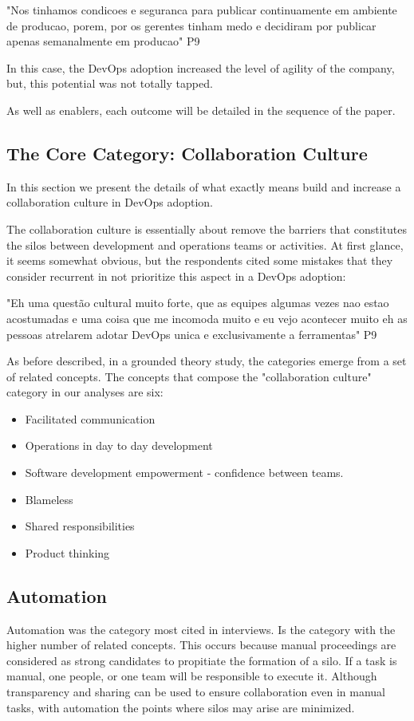 "Nos tinhamos condicoes e seguranca para publicar continuamente em ambiente de producao, porem, por os gerentes tinham medo e decidiram por publicar apenas semanalmente em producao" P9

In this case, the DevOps adoption increased the level of agility of the company, but, this potential was not totally tapped.

As well as enablers, each outcome will be detailed in the sequence of the paper.

\subsection{The Core Category: Collaboration Culture}
In this section we present the details of what exactly means build and increase a collaboration culture in DevOps adoption.

The collaboration culture is essentially about remove the barriers that constitutes the silos between development and operations teams or activities. At first glance, it seems somewhat obvious, but the respondents cited some mistakes that they consider recurrent in not prioritize this aspect in a DevOps adoption:

"Eh uma questão cultural muito forte, que as equipes algumas vezes nao estao acostumadas e uma coisa que me incomoda muito e eu vejo acontecer muito eh as pessoas atrelarem adotar DevOps unica e exclusivamente a ferramentas" P9

As before described, in a grounded theory study, the categories emerge from a set of related concepts. The concepts that compose the "collaboration culture" category in our analyses are six:

\begin{itemize}
\item Facilitated communication
\item Operations in day to day development
\item Software development empowerment - confidence between teams.
\item Blameless
\item Shared responsibilities
\item Product thinking
\end{itemize}

\subsection{Automation}
Automation was the category most cited in interviews. Is the category with the higher number of related concepts. This occurs because manual proceedings are considered as strong candidates to propitiate the formation of a silo. If a task is manual, one people, or one team will be responsible to execute it. Although transparency and sharing can be used to ensure collaboration even in manual tasks, with automation the points where silos may arise are minimized.

